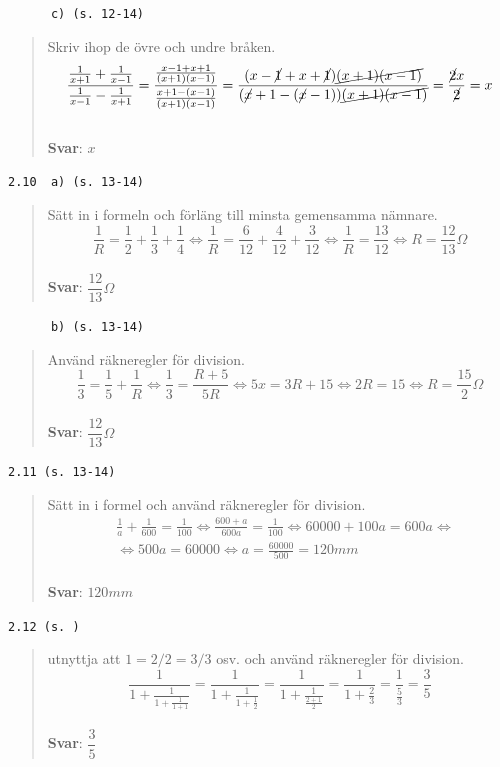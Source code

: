 \documentclass[a4paper]{article}
\newcommand{\tskcol}[1]{\textcolor{tskcol}{#1}}
\begin{document}
	\texttt{\tskcol{~~~~~~c) (s. 12-14)}}
	\begin{quotation}
		\noindent
		Skriv ihop de övre och undre bråken.
		\[\dfrac{\frac{1}{x+1}+\frac{1}{x-1}}{\frac{1}{x-1}-\frac{1}{x+1}}=
		\dfrac{\frac{x-1+x+1}{(x+1)(x-1)}}{\frac{x+1-(x-1)}{(x+1)(x-1)}}=
		\dfrac{(x-\cancel{1}+x+\cancel{1})\cancel{(x+1)(x-1)}}{(\cancel{x}+1-(\cancel{x}-1))\cancel{(x+1)(x-1)}}=
		\dfrac{\cancel{2}x}{\cancel{2}}=
		x\]
		\\
		\textbf{Svar}: $x$
	\end{quotation}
	
	\texttt{\tskcol{2.10~~a) (s. 13-14)}}
	\begin{quotation}
		\noindent
		Sätt in i formeln och förläng till minsta gemensamma nämnare.
		\[\frac{1}{R}=\frac{1}{2}+\frac{1}{3}+\frac{1}{4} \Leftrightarrow
		\frac{1}{R}=\frac{6}{12}+ \frac{4}{12}+\frac{3}{12} \Leftrightarrow
		\frac{1}{R}=\frac{13}{12} \Leftrightarrow
		R=\frac{12}{13}\Omega\]
		\\
		\textbf{Svar}: $\dfrac{12}{13}\Omega$
	\end{quotation}
	
	\texttt{\tskcol{~~~~~~b) (s. 13-14)}}
	\begin{quotation}
		\noindent
		Använd räkneregler för division.
		\[\frac{1}{3}=\frac{1}{5}+\frac{1}{R} \Leftrightarrow
		\frac{1}{3}=\frac{R+5}{5R} \Leftrightarrow
		5x=3R+15 \Leftrightarrow
		2R=15 \Leftrightarrow
		R=\frac{15}{2} \Omega\]
		\\
		\textbf{Svar}: $\dfrac{12}{13}\Omega$
	\end{quotation}
	
	\texttt{\tskcol{2.11 (s. 13-14)}}
	\begin{quotation}
		\noindent
		Sätt in i formel och använd räkneregler för division.
		\begin{align*}
		& \frac{1}{a}+\frac{1}{600}=\frac{1}{100} \Leftrightarrow
		\frac{600+a}{600a}=\frac{1}{100} \Leftrightarrow
		60000+100a=600a \Leftrightarrow \\
		& \Leftrightarrow 500a=60000 \Leftrightarrow
		a=\frac{60000}{500}=120mm
		\end{align*}
		\\
		\textbf{Svar}: $120mm$
	\end{quotation}
	
	\texttt{\tskcol{2.12 (s. )}}
	\begin{quotation}
		\noindent
		utnyttja att $1=2/2=3/3$ osv. och använd räkneregler för division.
		\[\dfrac{1}{1+\frac{1}{1+\frac{1}{1+1}}}=
		\dfrac{1}{1+\frac{1}{1+\frac{1}{2}}}=
		\dfrac{1}{1+\frac{1}{\frac{2+1}{2}}}=
		\dfrac{1}{1+\frac{2}{3}}=
		\dfrac{1}{\frac{5}{3}}=
		\dfrac{3}{5}\]
		\\
		\textbf{Svar}: $\dfrac{3}{5}$
	\end{quotation}
	
\end{document}
